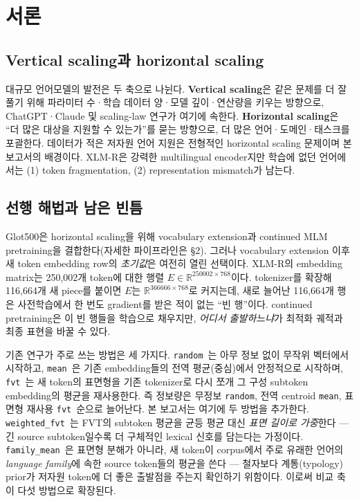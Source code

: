 \documentclass[11pt,a4paper]{article}
\newcommand{\rand}{\texttt{random}}
\newcommand{\meanm}{\texttt{mean}}
\newcommand{\fvt}{\texttt{fvt}}
\newcommand{\wfvt}{\texttt{weighted\_fvt}}
\newcommand{\famm}{\texttt{family\_mean}}
\begin{document}
\section{서론}

\subsection{Vertical scaling과 horizontal scaling}
대규모 언어모델의 발전은 두 축으로 나뉜다. \textbf{Vertical scaling}은 같은 문제를 더 잘 풀기 위해 파라미터 수·학습 데이터 양·모델 깊이·연산량을 키우는 방향으로, ChatGPT·Claude 및 scaling-law 연구가 여기에 속한다. \textbf{Horizontal scaling}은 ``더 많은 대상을 지원할 수 있는가''를 묻는 방향으로, 더 많은 언어·도메인·태스크를 포괄한다. 데이터가 적은 저자원 언어 지원은 전형적인 horizontal scaling 문제이며 본 보고서의 배경이다. XLM-R은 강력한 multilingual encoder지만 학습에 없던 언어에서는 (1) token fragmentation, (2) representation mismatch가 남는다.

\subsection{선행 해법과 남은 빈틈}
Glot500은 horizontal scaling을 위해 vocabulary extension과 continued MLM pretraining을 결합한다(자세한 파이프라인은 \S2). 그러나 vocabulary extension 이후 새 token embedding row의 \emph{초기값}은 여전히 열린 선택이다. XLM-R의 embedding matrix는 250{,}002개 token에 대한 행렬 $E\in\mathbb{R}^{250002\times768}$이다. tokenizer를 확장해 116{,}664개 새 piece를 붙이면 $E$는 $\mathbb{R}^{366666\times768}$로 커지는데, 새로 늘어난 116{,}664개 행은 사전학습에서 한 번도 gradient를 받은 적이 없는 ``빈 행''이다. continued pretraining은 이 빈 행들을 학습으로 채우지만, \emph{어디서 출발하느냐}가 최적화 궤적과 최종 표현을 바꿀 수 있다.

기존 연구가 주로 쓰는 방법은 세 가지다. \rand\ 는 아무 정보 없이 무작위 벡터에서 시작하고, \meanm\ 은 기존 embedding들의 전역 평균(중심)에서 안정적으로 시작하며, \fvt\ 는 새 token의 표면형을 기존 tokenizer로 다시 쪼개 그 구성 subtoken embedding의 평균을 재사용한다. 즉 정보량은 무정보 \rand, 전역 centroid \meanm, 표면형 재사용 \fvt\ 순으로 늘어난다. 본 보고서는 여기에 두 방법을 추가한다. \wfvt\ 는 FVT의 subtoken 평균을 균등 평균 대신 \emph{표면 길이로 가중}한다 --- 긴 source subtoken일수록 더 구체적인 lexical 신호를 담는다는 가정이다. \famm\ 은 표면형 분해가 아니라, 새 token이 corpus에서 주로 유래한 언어의 \emph{language family}에 속한 source token들의 평균을 쓴다 --- 철자보다 계통(typology) prior가 저자원 token에 더 좋은 출발점을 주는지 확인하기 위함이다. 이로써 비교 축이 다섯 방법으로 확장된다.
\end{document}
